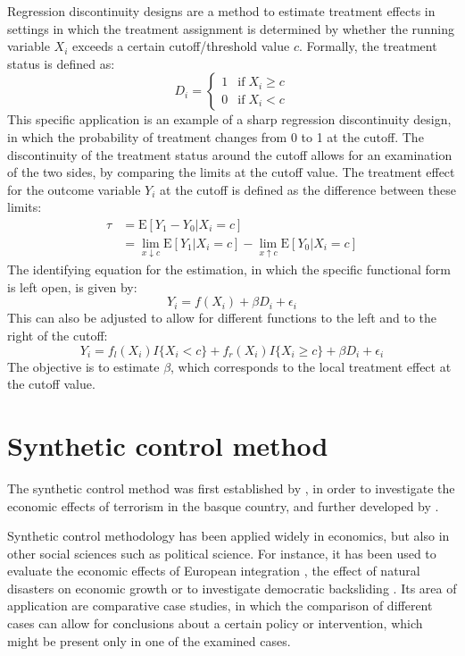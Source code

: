 \documentclass{scrbook}
\begin{document}
Regression discontinuity designs are a method to estimate treatment
effects in settings in which the treatment assignment is determined by
whether the running variable \(X_{i}\) exceeds a certain
cutoff/threshold value \(c\). Formally, the treatment status is defined
as: \begin{equation}
D_{i} = \begin{cases}
1 & \text{if}\; X_{i} \geq c \\
0 & \text{if}\; X_{i} < c
\end{cases}
\end{equation} This specific application is an example of a sharp
regression discontinuity design, in which the probability of treatment
changes from 0 to 1 at the cutoff. The discontinuity of the treatment
status around the cutoff allows for an examination of the two sides, by
comparing the limits at the cutoff value. The treatment effect for the
outcome variable \(Y_{i}\) at the cutoff is defined as the difference
between these limits: \begin{align}    
\tau & =\text{E}[Y_{1}-Y_{0}\vert X_{i}=c] \\
     & =\lim_{x\downarrow c} \text{E}[Y_{1}\vert X_{i}=c]-\lim_{x\uparrow c} \text{E}[Y_{0}\vert X_{i}=c] \nonumber
\end{align} \noindent The identifying equation for the estimation, in
which the specific functional form is left open, is given by:
\begin{equation}
Y_{i}=f(X_{i})+\beta D_{i}+\epsilon_{i}
\end{equation} This can also be adjusted to allow for different
functions to the left and to the right of the cutoff: \begin{equation}
Y_{i}=f_{l}(X_{i})I\{X_{i}<c\}+f_{r}(X_{i})I\{X_{i}\geq c\}+\beta D_{i}+\epsilon_{i}
\end{equation} The objective is to estimate \(\beta\), which corresponds
to the local treatment effect at the cutoff value.

\section{Synthetic control method}

The synthetic control method was first established by
\textcite{abadie_economic_2003}, in order to investigate the economic
effects of terrorism in the basque country, and further developed by
\textcite{abadie_synthetic_2010}.

Synthetic control methodology has been applied widely in economics, but
also in other social sciences such as political science. For instance,
it has been used to evaluate the economic effects of European
integration \parencite{campos_institutional_2019}, the effect of natural
disasters on economic growth \parencite{cavallo_catastrophic_2013} or to
investigate democratic backsliding
\parencite{meyerrose_unintended_2020}. Its area of application are
comparative case studies, in which the comparison of different cases can
allow for conclusions about a certain policy or intervention, which
might be present only in one of the examined cases.
\end{document}
